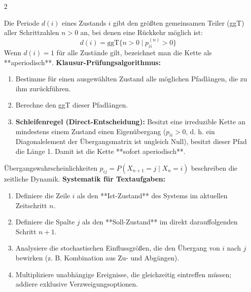 \documentclass[a4paper, 9pt]{extarticle}
\begin{document}
\begin{multicols*}{2}
\begin{tcolorbox}[title={Theorie: Das Kriterium der Aperiodizität}, colframe=markovviolet, colback=markovviolet!5, colbacktitle=markovviolet]
Die Periode $d(i)$ eines Zustands $i$ gibt den größten gemeinsamen Teiler (ggT) aller Schrittzahlen $n > 0$ an, bei denen eine Rückkehr möglich ist:
$$d(i) = \text{ggT} \{ n > 0 \mid p_{ii}^{(n)} > 0 \}$$
Wenn $d(i) = 1$ für alle Zustände gilt, bezeichnet man die Kette als **aperiodisch**.
\smallskip
\textbf{Klausur-Prüfungsalgorithmus:}
\begin{enumerate}
    \item Bestimme für einen ausgewählten Zustand alle möglichen Pfadlängen, die zu ihm zurückführen.
    \item Berechne den ggT dieser Pfadlängen.
    \item \textbf{Schleifenregel (Direct-Entscheidung):} Besitzt eine irreduzible Kette an mindestens einem Zustand einen Eigenübergang ($p_{ii} > 0$, d. h. ein Diagonalelement der Übergangsmatrix ist ungleich Null), besitzt dieser Pfad die Länge 1. Damit ist die Kette **sofort aperiodisch**.
\end{enumerate}
\end{tcolorbox}

\begin{tcolorbox}[title={Leitfaden: Übergangswahrscheinlichkeiten ermitteln}, colframe=markovviolet, colback=markovviolet!5, colbacktitle=markovviolet]
Übergangswahrscheinlichkeiten $p_{ij} = P(X_{n+1} = j \mid X_n = i)$ beschreiben die zeitliche Dynamik.
\smallskip
\textbf{Systematik für Textaufgaben:}
\begin{enumerate}
    \item Definiere die Zeile $i$ als den **Ist-Zustand** des Systems im aktuellen Zeitschritt $n$.
    \item Definiere die Spalte $j$ als den **Soll-Zustand** im direkt darauffolgenden Schritt $n+1$.
    \item Analysiere die stochastischen Einflussgrößen, die den Übergang von $i$ nach $j$ bewirken (z. B. Kombination aus Zu- und Abgängen).
    \item Multipliziere unabhängige Ereignisse, die gleichzeitig eintreffen müssen; addiere exklusive Verzweigungsoptionen.
\end{enumerate}
\end{tcolorbox}


\end{multicols*}
\end{document}
